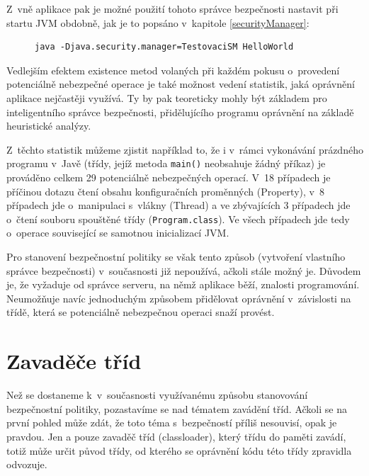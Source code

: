 Z~vně aplikace pak je možné použití tohoto správce bezpečnosti nastavit při startu JVM obdobně, jak je to popsáno v~kapitole \ref{securityManager}:

\begin{figure}[tbh]
\begin{lstlisting}[caption=Spuštění aplikace se správcem bezpečnosti, label=runWithSM]
java -Djava.security.manager=TestovaciSM HelloWorld
\end{lstlisting}
\end{figure}

Vedlejším efektem existence metod volaných při každém pokusu o~provedení potenciálně nebezpečné operace je také možnost vedení statistik, jaká oprávnění
aplikace nejčastěji využívá. Ty by pak teoreticky mohly být základem pro inteligentního správce bezpečnosti, přidělujícího programu oprávnění
na základě heuristické analýzy.

Z~těchto statistik můžeme zjistit například to, že i v~rámci vykonávání prázdného programu v~Javě (třídy, jejíž metoda {\tt main()} neobsahuje žádný příkaz) je prováděno celkem 29 potenciálně nebezpečných operací.
V~18 případech je příčinou dotazu čtení obsahu konfiguračních proměnných (Property), v~8 případech jde o~manipulaci s~vlákny (Thread) a ve zbývajících 3 případech jde o~čtení souboru spouštěné třídy ({\tt Program.class}). Ve všech případech jde tedy o~operace související se samotnou inicializací JVM.

Pro stanovení bezpečnostní politiky se však tento způsob (vytvoření vlastního správce bezpečnosti) v~současnosti již nepoužívá, ačkoli stále možný je.
Důvodem je, že vyžaduje od správce serveru, na němž aplikace běží, znalosti programování.
Neumožňuje navíc jednoduchým způsobem přidělovat oprávnění v~závislosti na třídě, která se potenciálně nebezpečnou operaci snaží provést.

\section{Zavaděče tříd} \label{classloader}

Než se dostaneme k~v~současnosti využívanému způsobu stanovování bezpečnostní politiky, pozastavíme se nad tématem zavádění tříd.
Ačkoli se na první pohled může zdát, že toto téma s~bezpečností příliš nesouvisí, opak je pravdou.
Jen a pouze zavaděč tříd (classloader), který třídu do paměti zavádí, totiž může určit původ třídy, od kterého se oprávnění kódu této třídy zpravidla odvozuje.

